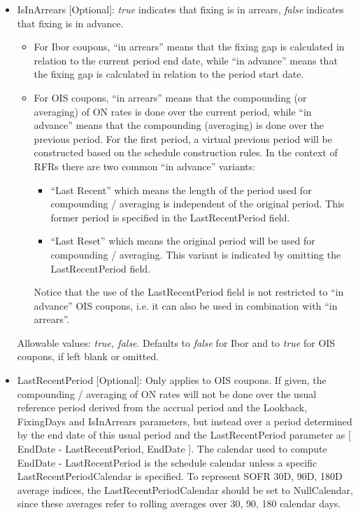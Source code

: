 \begin{itemize}
\item IsInArrears [Optional]: \emph{true} indicates that fixing is in arrears, \emph{false} indicates that fixing is in advance.
  \begin{itemize}
  \item For Ibor coupons, ``in arrears'' means that the fixing gap is calculated in relation to the current period end
    date, while ``in advance'' means that the fixing gap is calculated in relation to the period start date.
  \item For OIS coupons, ``in arrears'' means that the compounding (or averaging) of ON rates is done over the current
    period, while ``in advance'' means that the compounding (averaging) is done over the previous period. For the first
    period, a virtual previous period will be constructed based on the schedule construction rules. In the context of
    RFRs there are two common ``in advance'' variants:
    \begin{itemize}
    \item``Last Recent'' which means the length of the period used for compounding / averaging is independent of the
      original period. This former period is specified in the LastRecentPeriod field.
    \item ``Last Reset'' which means the original period will be used for compounding / averaging. This variant is
      indicated by omitting the LastRecentPeriod field.
    \end{itemize}
    Notice that the use of the LastRecentPeriod field is not restricted to ``in advance'' OIS coupons, i.e. it can also
    be used in combination with ``in arrears''.
  \end{itemize}

  Allowable values: \emph{true, false}. Defaults to \emph{false} for Ibor and to \emph{true} for OIS coupons, if left
  blank or omitted.

\item LastRecentPeriod [Optional]: Only applies to OIS coupons. If given, the compounding / averaging of ON rates will
  not be done over the usual reference period derived from the accrual period and the Lookback, FixingDays and
  IsInArrears parameters, but instead over a period determined by the end date of this usual period and the
  LastRecentPeriod parameter as [ EndDate - LastRecentPeriod, EndDate ]. The calendar used to compute EndDate -
  LastRecentPeriod is the schedule calendar unless a specific LastRecentPeriodCalendar is specified. To represent SOFR
  30D, 90D, 180D average indices, the LastRecentPeriodCalendar should be set to NullCalendar, since these averages refer
  to rolling averages over 30, 90, 180 calendar days. \\


\end{itemize}
